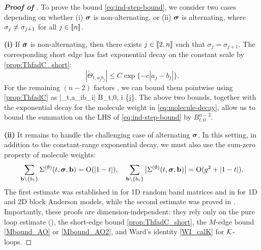 \begin{proof}[\bf Proof of ]
To prove the bound \eqref{eq:ind-step-bound}, we consider two cases depending on whether (i) $\bsig$ is non-alternating, or (ii) $\bsig$ is alternating, where $\sig_j\ne \sig_{j+1}$ for all $j\in \qqq{n}$.  

\medskip
{\noindent\bf (i)} If $\bsig$ is non-alternating, then there exists $j\in\qqq{2,n}$ such that $\sigma_j = \sigma_{j+1}$. The corresponding short edge has fast exponential decay on the constant scale by \eqref{prop:ThfadC_short}: %
\begin{equation}\label{eq:shortexternal}
    \left|\tilde{\Theta}_{t,a_jb_j}\right| \le C\exp\{-c|a_j - b_j|\}.
\end{equation}
For the remaining $(n-2)$ factors , we can bound them pointwise using \eqref{prop:ThfadC} as
\be\label{eq:pointwise_Theta}
    \left|\tilde{\Theta}_{t,a_ib_i}\right| \lesssim B_{t,0}, \quad \forall i \in{} \setminus \{j\}.
\ee
The above two bounds, together with the exponential decay for the molecule weight in \eqref{eq:molecule-decay}, allow us to bound the summation on the LHS of \eqref{eq:ind-step-bound} by $B_{t,0}^{n-2}$. %

 

\medskip
{\noindent\bf (ii)} It remains to handle the challenging case of alternating $\bsig$. In this setting, in addition to the constant-range exponential decay, we must also use the sum-zero property of molecule weights:
\begin{equation}\label{eq:Sigma-empty-sum-zero}
    \sum_{\mathbf{b}\setminus \{b_1\}} \Sigma^{(\emptyset)}(t, \bsig, \mathbf{b}) = \OO(|1-t|),\quad \sum_{\mathbf{b}\setminus \{b_1\}} \big|\Sigma^{(\emptyset)}(t, \bsig, \mathbf{b})\big| = \OO(\ilambda^2+|1-t|).
\end{equation}
The first estimate was established in \cite[Lemma 3.10]{YY_25} for 1D random band matrices and in \cite[Lemma 4.29]{RBSO1D} for 1D and 2D block Anderson models, while the second estimate was proved in \cite[Claim 4.30]{RBSO1D}. Importantly, these proofs are dimension-independent: they rely only on the pure loop estimate (), the short-edge bound \eqref{prop:ThfadC_short}, the $M$-edge bound \eqref{Mbound_AO} or \eqref{Mbound_AO2}, and Ward's identity \eqref{WI_calK} for $\cal K$-loops.



\end{proof}
